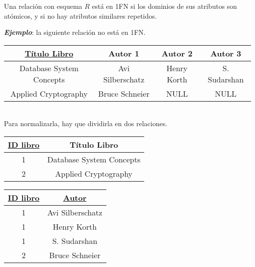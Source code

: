 \documentclass[a4paper, twoside]{article}
\begin{document}
Una relación con esquema $R$ está en 1FN si los dominios de sus atributos son atómicos, y si no hay atributos similares repetidos.

\textbf{\emph{Ejemplo}}: la siguiente relación no está en 1FN.\\

\begin{center}
	\begin{tabular}{|c|c|c|c|}
		\hline 
		\uline{Título Libro} & Autor 1 & Autor 2 & Autor 3\\
		\hline 
		\hline 
		Database System Concepts & Avi Silberschatz & Henry Korth & S. Sudarshan\\
		\hline 
		Applied Cryptography & Bruce Schneier & NULL & NULL\\
		\hline 
	\end{tabular}
\end{center}

~\\

Para normalizarla, hay que dividirla en dos relaciones.\\

\begin{minipage}{0.5\textwidth}
	\begin{center}
		\begin{tabular}{|c|c|}
			\hline 
			\uline{ID libro} & Título Libro\\
			\hline 
			\hline 
			1 & Database System Concepts\\
			\hline 
			2 & Applied Cryptography\\
			\hline 
		\end{tabular}
	\end{center}
\end{minipage}
\begin{minipage}{0.45\textwidth}
	\begin{center}
		\begin{tabular}{|c|c|}
			\hline 
			\uline{ID libro} & \uline{Autor}\\
			\hline 
			\hline 
			1 & Avi Silberschatz\\
			\hline 
			1 & Henry Korth\\
			\hline 
			1 & S. Sudarshan\\
			\hline 
			2 & Bruce Schneier\\
			\hline 
		\end{tabular}
	\end{center}
\end{minipage}
\end{document}
